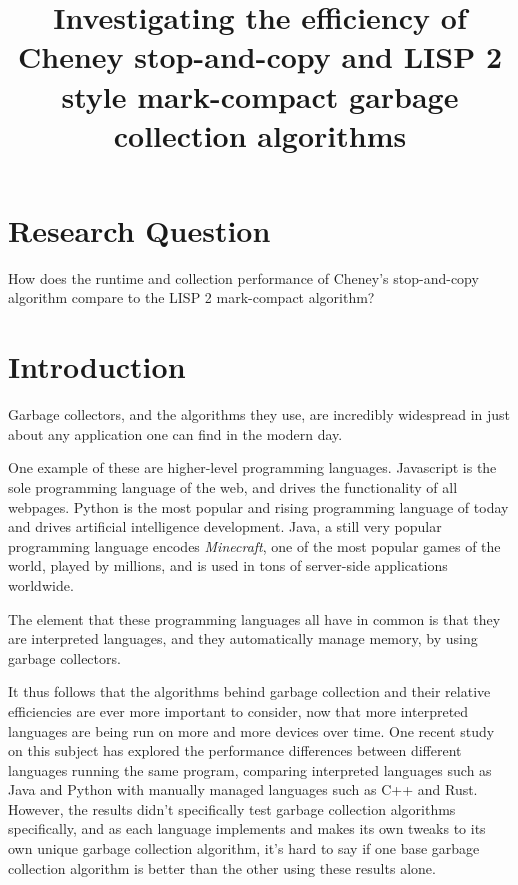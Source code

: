 \documentclass[index]{subfiles}
\begin{document}
\title{Investigating the efficiency of Cheney stop-and-copy and LISP 2 style mark-compact garbage collection algorithms}
\date{}
\author{}
\maketitle

\section{Research Question}

How does the runtime and collection performance of Cheney's stop-and-copy algorithm compare to the LISP 2 mark-compact algorithm?

\section{Introduction}

Garbage collectors, and the algorithms they use, are incredibly widespread in just about any application one can find in the modern day.

One example of these are higher-level programming languages. Javascript is the sole programming language of the web, and drives the functionality of all webpages. Python is the most popular and rising programming language of today and drives artificial intelligence development. Java, a still very popular programming language encodes \textit{Minecraft}, one of the most popular games of the world, played by millions, and is used in tons of server-side applications worldwide.

The element that these programming languages all have in common is that they are interpreted languages, and they automatically manage memory, by using garbage collectors.

It thus follows that the algorithms behind garbage collection and their relative efficiencies are ever more important to consider, now that more interpreted languages are being run on more and more devices over time. One recent study on this subject has explored the performance differences between different languages running the same program\cite{programming_languages_electricity}, comparing interpreted languages such as Java and Python with manually managed languages such as C++ and Rust. However, the results didn't specifically test garbage collection algorithms specifically, and as each language implements and makes its own tweaks to its own unique garbage collection algorithm, it's hard to say if one base garbage collection algorithm is better than the other using these results alone.
\end{document}
